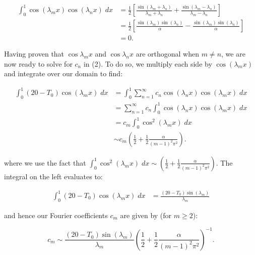 \begin{solution}
    \begin{align*}
        \int_{0}^{1}{\cos{(\lambda_m x)}\cos{(\lambda_n x)}\; dx} &= \frac{1}{2} \left[ \frac{\sin{(\lambda_m + \lambda_n)}}{\lambda_m + \lambda_n} + \frac{\sin{(\lambda_m - \lambda_n)}}{\lambda_m - \lambda_n} \right] \\
                                                                  &= \frac{1}{2} \left[ \frac{\sin{(\lambda_m)} \sin{(\lambda_n)}}{\alpha} - \frac{\sin{(\lambda_m)} \sin{(\lambda_n)}}{\alpha} \right] \\
                                                                  &= 0.
    \end{align*}

    \pagebreak
    Having proven that $\cos{\lambda_m x}$ and $\cos{\lambda_n x}$ are orthogonal when $m \neq n$, we are now ready to solve for $c_n$ in (2).
    To do so, we multiply each side by $\cos{(\lambda_m x)}$ and integrate over our domain to find:

    \begin{align*}
        \int_{0}^{1}{(20 - T_0) \cos{(\lambda_m x)}\; dx} &= \int_{0}^{1}{\sum_{n=1}^{\infty}{c_n \cos{(\lambda_n x)}} \cos{(\lambda_m x)}\; dx} \\
                                                          &= \sum_{n=1}^{\infty}{c_n  \int_{0}^{1}{\cos{(\lambda_n x)} \cos{(\lambda_m x)}\; dx} } \\
                                                          &= c_m \int_{0}^{1}{\cos^2{(\lambda_m x)}\; dx} \\
                                                          &\sim c_m \left(\frac{1}{2} + \frac{1}{2}\frac{\alpha}{(m-1)^2 \pi^2} \right).
    \end{align*}

    where we use the fact that $\int_{0}^{1}{\cos^2{(\lambda_m x)}\; dx} \sim \left(\frac{1}{2} + \frac{1}{2}\frac{\alpha}{(m-1)^2 \pi^2} \right)$.
    The integral on the left evaluates to:

    \begin{align*}
        \int_{0}^{1}{(20 - T_0) \cos{(\lambda_m x)}\; dx} &= \frac{(20 - T_0) \sin{(\lambda_m)}}{\lambda_m}
    \end{align*}

    and hence our Fourier coefficients $c_m$ are given by (for $m \ge 2$):

    $$
        c_m \sim \frac{(20 - T_0) \sin{(\lambda_m)}}{\lambda_m} \left(\frac{1}{2} + \frac{1}{2}\frac{\alpha}{(m-1)^2 \pi^2} \right)^{-1}.
    $$


\end{solution}
